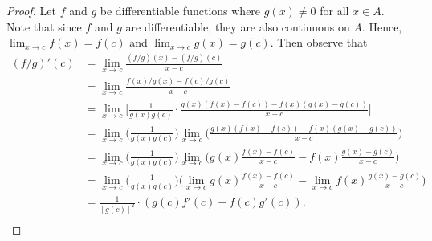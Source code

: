 \begin{enumerate}
\begin{proof}
        Let \( f  \) and \( g  \) be differentiable functions where \( g(x) \neq 0  \) for all \( x \in A   \). Note that since \(f \) and \( g  \) are differentiable, they are also continuous on \( A  \). Hence, \( \lim_{ x \to c  } f(x) = f(c)  \) and \( \lim_{ x \to c  } g(x) = g(c)  \). Then observe that 
        \begin{align*}
            (f/g)'(c) &= \lim_{ x \to c  } \frac{ (f/g)(x) - (f/g)(c)  }{ x - c  }  \\
                      &= \lim_{ x \to c  } \frac{ f(x) / g(x) - f(c) / g(c)  }{ x - c  } \\
                      &= \lim_{ x \to c  } \Big[ \frac{ 1 }{ g(x) g(c)  } \cdot \frac{ g(x) (f(x) - f(c)) - f(x) (g(x) - g(c) ) }{ x - c   } \Big] \\ 
                      &= \lim_{ x  \to c  } \Big( \frac{ 1 }{ g(x) g(c) }  \Big) \lim_{ x \to c  } \Big( \frac{ g(x) (f(x) - f(c) )  - f(x) (g(x) - g(c) )}{ x - c  }  \Big) \\
                      &= \lim_{ x \to c  } \Big( \frac{ 1 }{ g(x) g(c)  }  \Big) \lim_{ x \to c  } \Big( g(x) \frac{ f(x) - f(c)  }{ x - c  } - f(x) \frac{ g(x) - g(c)  }{ x - c  }  \Big) \\
                      &= \lim_{ x \to c  } \Big( \frac{ 1 }{ g(x) g(c)  }   \Big) \Big( \lim_{ x \to c  } g(x) \frac{ f(x) - f(c)  }{ x - c  } - \lim_{ x \to c  } f(x) \frac{ g(x) - g(c)  }{ x - c  }  \Big) \\
                      &= \frac{ 1 }{ [g(c)]^2  } \cdot (g(c) f'(c) - f(c)g'(c) ). \\ 
        \end{align*}
            \end{proof}
\end{enumerate}

